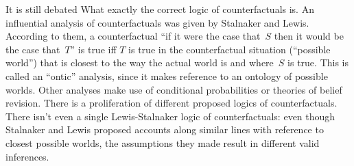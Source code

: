 \documentclass[../../../include/open-logic-section]{subfiles}
\begin{document}
It is still debated What exactly the correct logic of counterfactuals
is. An influential analysis of counterfactuals was given by Stalnaker
and Lewis.  According to them, a counterfactual ``if it were the case
that~$S$ then it would be the case that~$T$'' is true iff $T$ is true
in the counterfactual situation (``possible world'') that is closest
to the way the actual world is and where~$S$ is true. This is called
an ``ontic'' analysis, since it makes reference to an ontology of
possible worlds. Other analyses make use of conditional probabilities
or theories of belief revision.  There is a proliferation of different
proposed logics of counterfactuals. There isn't even a single
Lewis-Stalnaker logic of counterfactuals: even though Stalnaker and
Lewis proposed accounts along similar lines with reference to closest
possible worlds, the assumptions they made result in different valid
inferences.
\end{document}
